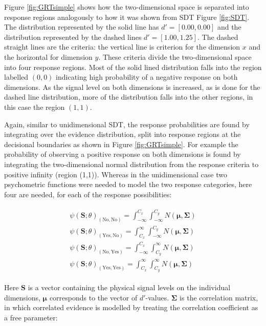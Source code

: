 \documentclass{article}\usepackage{knitr}
\begin{document}
Figure \ref{fig:GRTsimple} shows how the two-dimensional space is separated into response regions analogously to how it was shown from SDT Figure \ref{fig:SDT}. The distribution represented by the solid line has $d' = [0.00, 0.00]$ and the distribution represented by the dashed lines $d' = [1.00, 1.25]$. The dashed straight lines are the criteria: the vertical line is criterion for the dimension $x$ and the horizontal for dimension $y$. These criteria divide the two-dimensional space into four response regions. Most of the solid lined distribution falls into the region labelled $(0, 0)$ indicating high probability of a negative response on both dimensions. As the signal level on both dimensions is increased, as is done for the dashed line distribution, more of the distribution falls into the other regions, in this case the region $(1,1)$.  

Again, similar to unidimensional SDT, the response probabilities are found by integrating over the evidence distribution, split into response regions at the decisional boundaries as shown in Figure \ref{fig:GRTsimple}. For example the probability of observing a positive response on both dimensions is found by  integrating the two-dimensional normal distribution from the response criteria to positive infinity (region (1,1)). Whereas in the unidimensional case two psychometric functions were needed to model the two response categories, here four are needed, for each of the response possibilities:

\begin{align}
\begin{split}
\label{eq:probs}
\psi(\bm{S}; \theta)_{(\text{No}, \text{No})}  = \int_{-\infty}^{C_x} \int_{-\infty}^{C_y} N(\bm{\mu}, \bm{\Sigma})
\\
\psi(\bm{S}; \theta)_{(\text{Yes}, \text{No})}  = \int_{C_x}^{\infty} \int_{-\infty}^{C_y} N(\bm{\mu}, \bm{\Sigma})
\\
\psi(\bm{S}; \theta)_{(\text{No}, \text{Yes})}  = \int_{-\infty}^{C_x} \int_{C_y}^{\infty} N(\bm{\mu}, \bm{\Sigma})
\\
\psi(\bm{S}; \theta)_{(\text{Yes}, \text{Yes})}  = \int_{C_x}^{\infty} \int_{C_y}^{\infty} N(\bm{\mu}, \bm{\Sigma})
\end{split}
\end{align}

Here $\bm{S}$ is a vector containing the physical signal levels on the individual dimensions, $\bm{\mu}$ corresponds to the vector of $d'$-values. $\bm{\Sigma}$ is the correlation matrix, in which correlated evidence is modelled by treating the correlation coefficient as a free parameter:
\end{document}
